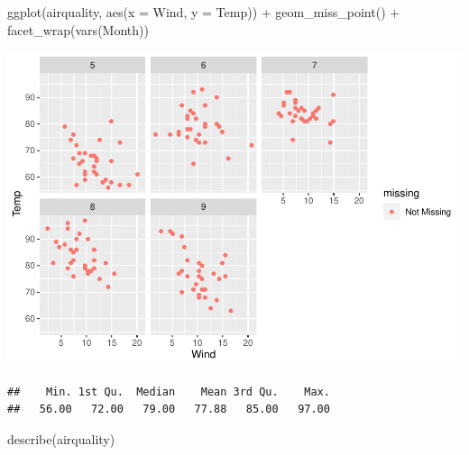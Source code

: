 \documentclass[
  12pt,
]{article}
\newenvironment{Shaded}{\begin{snugshade}}{\end{snugshade}}
\newcommand{\AttributeTok}[1]{\textcolor[rgb]{0.77,0.63,0.00}{#1}}
\newcommand{\FunctionTok}[1]{\textcolor[rgb]{0.00,0.00,0.00}{#1}}
\newcommand{\NormalTok}[1]{#1}
\newcommand{\OtherTok}[1]{\textcolor[rgb]{0.56,0.35,0.01}{#1}}
\newcommand{\SpecialCharTok}[1]{\textcolor[rgb]{0.00,0.00,0.00}{#1}}
\begin{document}
\begin{Shaded}
\begin{Highlighting}[]
\FunctionTok{ggplot}\NormalTok{(airquality, }\FunctionTok{aes}\NormalTok{(}\AttributeTok{x =}\NormalTok{ Wind, }\AttributeTok{y =}\NormalTok{ Temp)) }\SpecialCharTok{+}
\FunctionTok{geom\_miss\_point}\NormalTok{() }\SpecialCharTok{+}
\FunctionTok{facet\_wrap}\NormalTok{(}\FunctionTok{vars}\NormalTok{(Month))}
\end{Highlighting}
\end{Shaded}

\includegraphics{articleCustomerDropoutMembership_files/figure-latex/Stats1-7.pdf}

\begin{Shaded}
\end{Shaded}

\begin{verbatim}
##    Min. 1st Qu.  Median    Mean 3rd Qu.    Max. 
##   56.00   72.00   79.00   77.88   85.00   97.00
\end{verbatim}

\begin{Shaded}
\begin{Highlighting}[]
\FunctionTok{describe}\NormalTok{(airquality)}
\end{Highlighting}
\end{Shaded}
\end{document}
